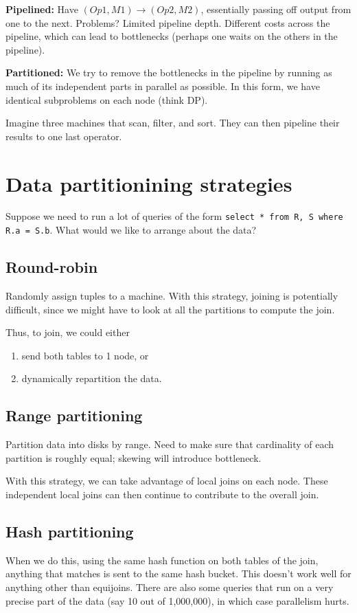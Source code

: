 \documentclass{article}
\begin{document}
\textbf{Pipelined:} Have $(Op1,M1)\rightarrow(Op2,M2)$, essentially passing off output from one to the next. Problems? Limited pipeline depth. Different costs across the pipeline, which can lead to bottlenecks (perhaps one waits on the others in the pipeline).

\textbf{Partitioned:} We try to remove the bottlenecks in the pipeline by running as much of its independent parts in parallel as possible. In this form, we have identical subproblems on each node (think DP). 

Imagine three machines that scan, filter, and sort. They can then pipeline their results to one last operator.

\section{Data partitionining strategies}

Suppose we need to run a lot of queries of the form \verb|select * from R, S where R.a = S.b|. What would we like to arrange about the data?

\subsection{Round-robin} Randomly assign tuples to a machine. With this strategy, joining is potentially difficult, since we might have to look at all the partitions to compute the join.

Thus, to join, we could either
\begin{enumerate}
    \item send both tables to 1 node, or
    \item dynamically repartition the data.
\end{enumerate}

\subsection{Range partitioning} Partition data into disks by range. Need to make sure that cardinality of each partition is roughly equal; skewing will introduce bottleneck. 

With this strategy, we can take advantage of local joins on each node. These independent local joins can then continue to contribute to the overall join.

\subsection{Hash partitioning} When we do this, using the same hash function on both tables of the join, anything that matches is sent to the same hash bucket. This doesn't work well for anything other than equijoins. There are also some queries that run on a very precise part of the data (say 10 out of 1,000,000), in which case parallelism hurts.
\end{document}
